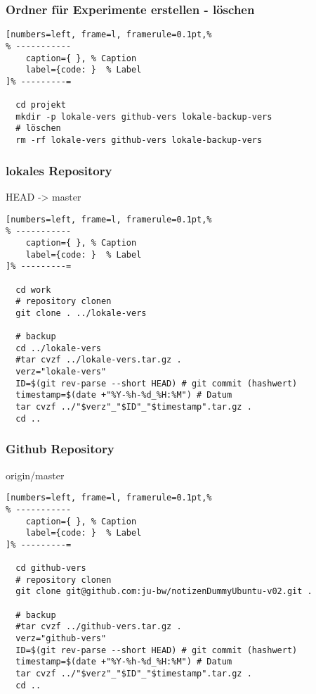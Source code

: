 \subsubsection{Ordner für Experimente erstellen -
löschen}\label{ordner-fuer-experimente-erstellen-loeschen-1}

\lstset{language=Bash} %
\begin{lstlisting}[numbers=left, frame=l, framerule=0.1pt,%
% -----------
	caption={ }, % Caption
	label={code: }  % Label
]% ---------=

  cd projekt
  mkdir -p lokale-vers github-vers lokale-backup-vers
  # löschen
  rm -rf lokale-vers github-vers lokale-backup-vers
\end{lstlisting}

\subsubsection{lokales Repository}\label{lokales-repository}

HEAD -> master

\lstset{language=Bash} %
\begin{lstlisting}[numbers=left, frame=l, framerule=0.1pt,%
% -----------
	caption={ }, % Caption
	label={code: }  % Label
]% ---------=

  cd work
  # repository clonen
  git clone . ../lokale-vers

  # backup
  cd ../lokale-vers
  #tar cvzf ../lokale-vers.tar.gz .
  verz="lokale-vers"
  ID=$(git rev-parse --short HEAD) # git commit (hashwert)
  timestamp=$(date +"%Y-%h-%d_%H:%M") # Datum
  tar cvzf ../"$verz"_"$ID"_"$timestamp".tar.gz .
  cd ..
\end{lstlisting}

\subsubsection{Github Repository}\label{github-repository}

origin/master

\lstset{language=Bash} %
\begin{lstlisting}[numbers=left, frame=l, framerule=0.1pt,%
% -----------
	caption={ }, % Caption
	label={code: }  % Label
]% ---------=

  cd github-vers
  # repository clonen
  git clone git@github.com:ju-bw/notizenDummyUbuntu-v02.git .

  # backup
  #tar cvzf ../github-vers.tar.gz .
  verz="github-vers"
  ID=$(git rev-parse --short HEAD) # git commit (hashwert)
  timestamp=$(date +"%Y-%h-%d_%H:%M") # Datum
  tar cvzf ../"$verz"_"$ID"_"$timestamp".tar.gz .
  cd ..
\end{lstlisting}

